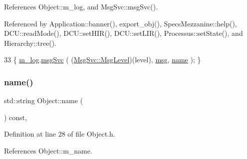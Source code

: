 References Object\+::m\+\_\+log, and Msg\+Svc\+::msg\+Svc().



Referenced by Application\+::banner(), export\+\_\+obj(), Specs\+Mezzanine\+::help(), D\+C\+U\+::read\+Mode(), D\+C\+U\+::set\+H\+I\+R(), D\+C\+U\+::set\+L\+I\+R(), Processus\+::set\+State(), and Hierarchy\+::tree().


\begin{DoxyCode}
33 \{ \hyperlink{classObject_a0d269813dd7ac1f24bc143031e2963f2}{m\_log}.\hyperlink{classMsgSvc_ad25f18047920cc59a314e5098259711c}{msgSvc} ( (\hyperlink{classMsgSvc_ae671eb7301996cd049d2da8a65925926}{MsgSvc::MsgLevel})(level), \hyperlink{classObject_a58b2d0618c2d08cf2383012611528d97}{msg}, 
      \hyperlink{classObject_a300f4c05dd468c7bb8b3c968868443c1}{name} ); \}
\end{DoxyCode}
\mbox{\label{classObject_a300f4c05dd468c7bb8b3c968868443c1}} 
\subsubsection{\texorpdfstring{name()}{name()}}
{\footnotesize\ttfamily std\+::string Object\+::name (\begin{DoxyParamCaption}{ }\end{DoxyParamCaption}) const\hspace{0.3cm}{\ttfamily [inline]}, {\ttfamily [inherited]}}



Definition at line 28 of file Object.\+h.



References Object\+::m\+\_\+name.




